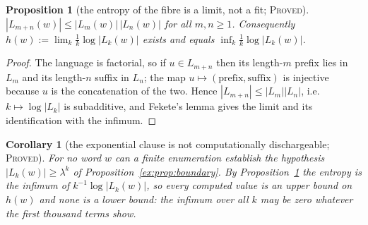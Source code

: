 \documentclass[11pt]{article}
\newtheorem{proposition}[theorem]{Proposition}
\newtheorem{corollary}[theorem]{Corollary}
\theoremstyle{definition}
\theoremstyle{remark}
\newcommand{\PROVED}{\textsc{Proved}}
\begin{document}
\begin{proposition}[the entropy of the fibre is a limit, not a fit; \PROVED]\label{ex:prop:fekete}
$|L_{m+n}(w)|\le|L_m(w)|\,|L_n(w)|$ for all $m,n\ge1$. Consequently
$h(w):=\lim_k\frac1k\log|L_k(w)|$ exists and equals $\inf_k\frac1k\log|L_k(w)|$.
\end{proposition}
\begin{proof}
The language is factorial, so if $u\in L_{m+n}$ then its length-$m$ prefix lies in $L_m$ and its length-$n$
suffix in $L_n$; the map $u\mapsto(\text{prefix},\text{suffix})$ is injective because $u$ is the
concatenation of the two. Hence $|L_{m+n}|\le|L_m||L_n|$, i.e.\ $k\mapsto\log|L_k|$ is subadditive, and
Fekete's lemma \cite{Fekete} gives the limit and its identification with the infimum.
\end{proof}

\begin{corollary}[the exponential clause is not computationally dischargeable; \PROVED]\label{ex:cor:infimum}
For no word $w$ can a finite enumeration establish the hypothesis $|L_k(w)|\ge\lambda^k$ of
Proposition~\ref{ex:prop:boundary}. By Proposition~\ref{ex:prop:fekete} the entropy is the
\emph{infimum} of $k^{-1}\log|L_k(w)|$, so every computed value is an \emph{upper} bound on $h(w)$ and
none is a lower bound: the infimum over all $k$ may be zero whatever the first thousand terms show.
\end{corollary}
\end{document}
